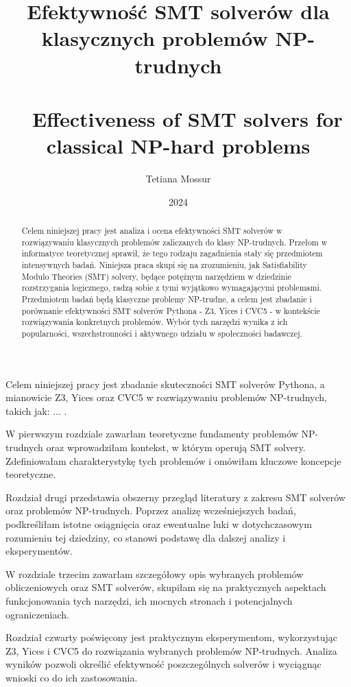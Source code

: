 \documentclass[xodstep]{wnspt}
\author   {Tetiana Mossur}
\date     {2024}
\title{Efektywność SMT solverów dla klasycznych problemów NP-trudnych
\\{~}
\\{~}
Effectiveness of SMT solvers for classical NP-hard problems}
\begin{document}
\begin{abstract}
Celem niniejszej pracy jest analiza i ocena efektywności SMT solverów w rozwiązywaniu klasycznych problemów zaliczanych do klasy NP-trudnych. Przełom w informatyce teoretycznej sprawił, że tego rodzaju zagadnienia stały się przedmiotem intensywnych badań. Niniejsza praca skupi się na zrozumieniu, jak Satisfiability Modulo Theories (SMT) solvery, będące potężnym narzędziem w dziedzinie rozstrzygania logicznego, radzą sobie z tymi wyjątkowo wymagającymi problemami.
Przedmiotem badań będą klasyczne problemy NP-trudne, a celem jest zbadanie i porównanie efektywności SMT solverów Pythona - Z3, Yices i CVC5 - w kontekście rozwiązywania konkretnych problemów. Wybór tych narzędzi wynika z ich popularności, wszechstronności i aktywnego udziału w społeczności badawczej.

\end{abstract}

\maketitle
\onehalfspacing

\introduction

Celem niniejszej pracy jest zbadanie skuteczności SMT solverów Pythona, a mianowicie Z3, Yices oraz CVC5 w rozwiązywaniu problemów NP-trudnych, takich jak: ... .

W pierwszym rozdziale zawarłam teoretyczne fundamenty problemów NP-trudnych oraz wprowadziłam kontekst, w którym operują SMT solvery. Zdefiniowałam charakterystykę tych problemów i omówiłam kluczowe koncepcje teoretyczne.

Rozdział drugi przedstawia obszerny przegląd literatury z zakresu SMT solverów oraz problemów NP-trudnych. Poprzez analizę wcześniejszych badań, podkreśliłam istotne osiągnięcia oraz ewentualne luki w dotychczasowym rozumieniu tej dziedziny, co stanowi podstawę dla dalszej analizy i eksperymentów.

W rozdziale trzecim zawarłam szczegółowy opis wybranych problemów obliczeniowych oraz SMT solverów, skupiłam się na praktycznych aspektach funkcjonowania tych narzędzi, ich mocnych stronach i potencjalnych ograniczeniach.

Rozdział czwarty poświęcony jest praktycznym eksperymentom, wykorzystując Z3, Yices i CVC5 do rozwiązania wybranych problemów NP-trudnych. Analiza wyników pozwoli określić efektywność poszczególnych solverów i wyciągnąc wnioski co do ich zastosowania.
\end{document}
